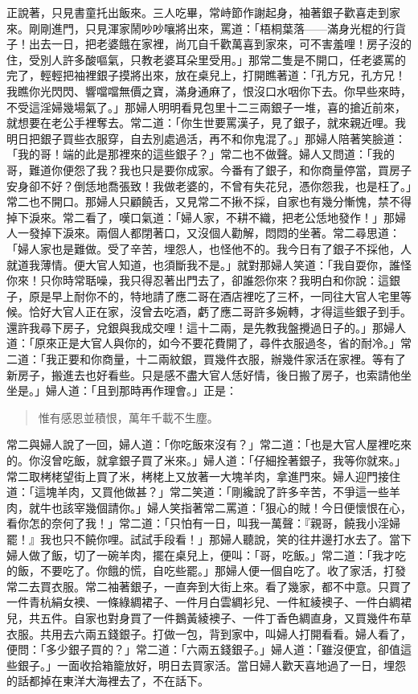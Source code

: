 正說著，只見書童托出飯來。三人吃畢，常峙節作謝起身，袖著銀子歡喜走到家來。剛剛進門，只見渾家鬧吵吵嚷將出來，罵道：「梧桐葉落——滿身光棍的行貨子！出去一日，把老婆餓在家裡，尚兀自千歡萬喜到家來，可不害羞哩！房子沒的住，受別人許多酸嘔氣，只教老婆耳朵里受用。」那常二隻是不開口，任老婆罵的完了，輕輕把袖裡銀子摸將出來，放在桌兒上，打開瞧著道：「孔方兄，孔方兄！我瞧你光閃閃、響噹噹無價之寶，滿身通麻了，恨沒口水咽你下去。你早些來時，不受這淫婦幾場氣了。」那婦人明明看見包里十二三兩銀子一堆，喜的搶近前來，就想要在老公手裡奪去。常二道：「你生世要罵漢子，見了銀子，就來親近哩。我明日把銀子買些衣服穿，自去別處過活，再不和你鬼混了。」那婦人陪著笑臉道：「我的哥！端的此是那裡來的這些銀子？」常二也不做聲。婦人又問道：「我的哥，難道你便怨了我？我也只是要你成家。今番有了銀子，和你商量停當，買房子安身卻不好？倒恁地喬張致！我做老婆的，不曾有失花兒，憑你怨我，也是枉了。」常二也不開口。那婦人只顧饒舌，又見常二不揪不採，自家也有幾分慚愧，禁不得掉下淚來。常二看了，嘆口氣道：「婦人家，不耕不織，把老公恁地發作！」那婦人一發掉下淚來。兩個人都閉著口，又沒個人勸解，悶悶的坐著。常二尋思道：「婦人家也是難做。受了辛苦，埋怨人，也怪他不的。我今日有了銀子不採他，人就道我薄情。便大官人知道，也須斷我不是。」就對那婦人笑道：「我自耍你，誰怪你來！只你時常聒噪，我只得忍著出門去了，卻誰怨你來？我明白和你說：這銀子，原是早上耐你不的，特地請了應二哥在酒店裡吃了三杯，一同往大官人宅里等候。恰好大官人正在家，沒曾去吃酒，虧了應二哥許多婉轉，才得這些銀子到手。還許我尋下房子，兌銀與我成交哩！這十二兩，是先教我盤攪過日子的。」那婦人道：「原來正是大官人與你的，如今不要花費開了，尋件衣服過冬，省的耐冷。」常二道：「我正要和你商量，十二兩紋銀，買幾件衣服，辦幾件家活在家裡。等有了新房子，搬進去也好看些。只是感不盡大官人恁好情，後日搬了房子，也索請他坐坐是。」婦人道：「且到那時再作理會。」正是：
\begin{quote}
惟有感恩並積恨，萬年千載不生塵。
\end{quote}

常二與婦人說了一回，婦人道：「你吃飯來沒有？」常二道：「也是大官人屋裡吃來的。你沒曾吃飯，就拿銀子買了米來。」婦人道：「仔細拴著銀子，我等你就來。」常二取栲栳望街上買了米，栲栳上又放著一大塊羊肉，拿進門來。婦人迎門接住道：「這塊羊肉，又買他做甚？」常二笑道：「剛纔說了許多辛苦，不爭這一些羊肉，就牛也該宰幾個請你。」婦人笑指著常二罵道：「狠心的賊！今日便懷恨在心，看你怎的奈何了我！」常二道：「只怕有一日，叫我一萬聲：『親哥，饒我小淫婦罷！』我也只不饒你哩。試試手段看！」那婦人聽說，笑的往井邊打水去了。當下婦人做了飯，切了一碗羊肉，擺在桌兒上，便叫：「哥，吃飯。」常二道：「我才吃的飯，不要吃了。你餓的慌，自吃些罷。」那婦人便一個自吃了。收了家活，打發常二去買衣服。常二袖著銀子，一直奔到大街上來。看了幾家，都不中意。只買了一件青杭絹女襖、一條綠綢裙子、一件月白雲綢衫兒、一件紅綾襖子、一件白綢裙兒，共五件。自家也對身買了一件鵝黃綾襖子、一件丁香色綢直身，又買幾件布草衣服。共用去六兩五錢銀子。打做一包，背到家中，叫婦人打開看看。婦人看了，便問：「多少銀子買的？」常二道：「六兩五錢銀子。」婦人道：「雖沒便宜，卻值這些銀子。」一面收拾箱籠放好，明日去買家活。當日婦人歡天喜地過了一日，埋怨的話都掉在東洋大海裡去了，不在話下。

